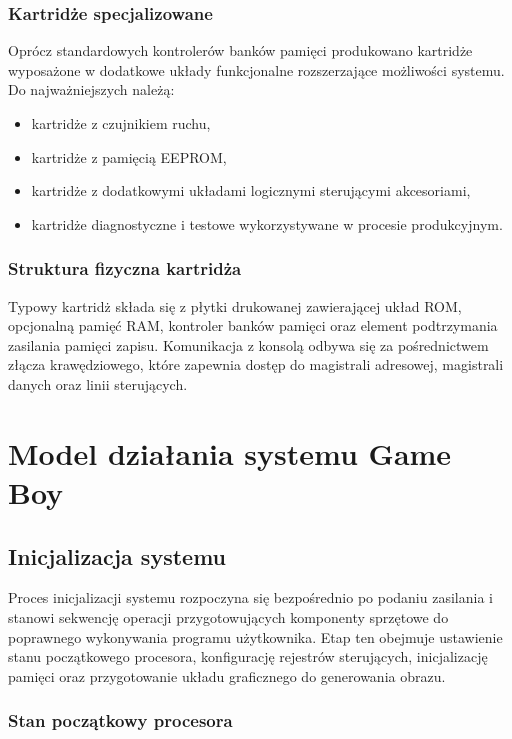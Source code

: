 \documentclass{article}
\begin{document}
\subsubsection{Kartridże specjalizowane}

Oprócz standardowych kontrolerów banków pamięci produkowano kartridże wyposażone w dodatkowe układy funkcjonalne rozszerzające możliwości systemu. Do najważniejszych należą:

\begin{itemize}
	\item kartridże z czujnikiem ruchu,
	\item kartridże z pamięcią EEPROM,
	\item kartridże z dodatkowymi układami logicznymi sterującymi akcesoriami,
	\item kartridże diagnostyczne i testowe wykorzystywane w procesie produkcyjnym.
\end{itemize}

\subsubsection{Struktura fizyczna kartridża}

Typowy kartridż składa się z płytki drukowanej zawierającej układ ROM, opcjonalną pamięć RAM, kontroler banków pamięci oraz element podtrzymania zasilania pamięci zapisu. Komunikacja z konsolą odbywa się za pośrednictwem złącza krawędziowego, które zapewnia dostęp do magistrali adresowej, magistrali danych oraz linii sterujących.
\newpage
\section{Model działania systemu Game Boy}
\subsection{Inicjalizacja systemu}

Proces inicjalizacji systemu rozpoczyna się bezpośrednio po podaniu zasilania i stanowi sekwencję operacji przygotowujących komponenty sprzętowe do poprawnego wykonywania programu użytkownika. Etap ten obejmuje ustawienie stanu początkowego procesora, konfigurację rejestrów sterujących, inicjalizację pamięci oraz przygotowanie układu graficznego do generowania obrazu.

\subsubsection{Stan początkowy procesora}
\end{document}
